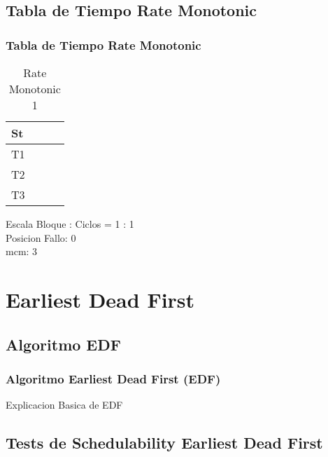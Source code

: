 \documentclass[xcolor=table]{beamer}
\begin{document}
\subsection{Tabla de Tiempo  Rate Monotonic } 

\begin{frame} 
\frametitle{Tabla de Tiempo  Rate Monotonic } 
\begin{table} 
\centering 
\begin{tabular}{|l|l|l|l|} 
\hline 
St & \cellcolor{green} & \cellcolor{green} & \cellcolor{green} \\ \hline 
T1 & \cellcolor{blue} & & \\ \hline 
T2 & & \cellcolor{purple} & \\ \hline 
T3 & & & \cellcolor{cyan} \\ \hline 
\end{tabular} 
\caption{ Rate Monotonic 1 } 
\end{table} 
Escala Bloque : Ciclos = 1 : 1 \\ 
Posicion Fallo:  0 \\ 
mcm:  3 \\ 
\end{frame} 


\section{Earliest Dead First}

\subsection{Algoritmo EDF}

\begin{frame} 
\frametitle{Algoritmo Earliest Dead First (EDF)} 
Explicacion Basica de EDF \\
\end{frame}

\subsection{Tests de Schedulability  Earliest Dead First } 
\end{document}
